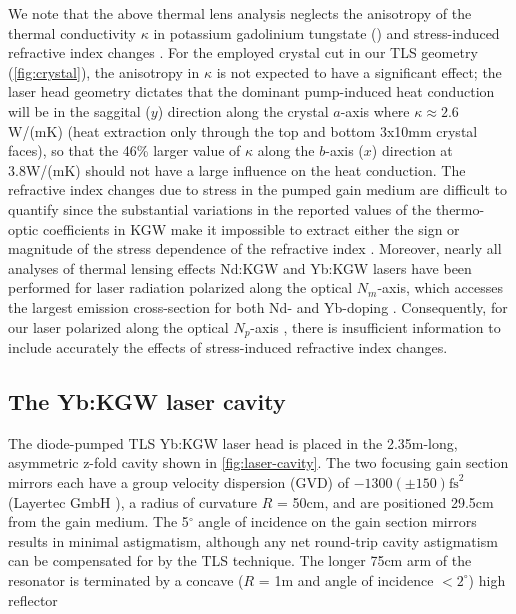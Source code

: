 We note that the above thermal lens analysis neglects the anisotropy of the thermal conductivity $\kappa$ in potassium gadolinium tungstate () \cite{Biswal_thermo_optical_05,mochalov_laser_1997} and stress-induced refractive index changes \cite{Yumashev_laser_2007}.
For the employed crystal cut in our TLS geometry (\ref{fig:crystal}), the anisotropy in $\kappa$ \cite{mochalov_laser_1997,website_EKSPLA} is not expected to have a significant effect; the laser head geometry dictates that the dominant pump-induced heat conduction will be in the saggital ($y$) direction along the crystal $a$-axis where $\kappa \approx 2.6$W/(mK) (heat extraction only through the top and bottom 3x10mm crystal faces), so that the 46\% larger value of $\kappa$ along the $b$-axis ($x$) direction at 3.8W/(mK) should not have a large influence on the heat conduction.
The refractive index
changes due to stress in the pumped gain medium are difficult to quantify since the substantial variations in the reported values of the thermo-optic coefficients in KGW make it impossible to extract either the sign or magnitude of the stress dependence of the refractive index \cite{website_time_bandwidth}.
Moreover, nearly all analyses of thermal lensing effects Nd:KGW and Yb:KGW lasers have been performed for laser radiation polarized along the optical $N_m$-axis, which accesses the largest emission cross-section for both Nd- and Yb-doping \cite{Yumashev_laser_2007,Hellstrom_efficient_2006}.
Consequently, for our laser polarized along the optical $N_p$-axis \cite{Holtom_mode_locked_2006}, there is insufficient information to include accurately the effects of stress-induced refractive index changes.

\subsection{The Yb:KGW laser cavity}

The diode-pumped TLS Yb:KGW laser head is placed in the 2.35m-long, asymmetric z-fold cavity shown in \ref{fig:laser-cavity}.
The two focusing gain section mirrors each have a group velocity dispersion (GVD) of $-1300 ( \pm 150 ) \text{fs}^2$ (Layertec GmbH \cite{website_layertec}), a radius of curvature $R$ = 50cm, and are positioned 29.5cm from the gain medium.
The 5$^\circ$ angle of incidence on the gain section mirrors results in minimal astigmatism, although any net round-trip cavity astigmatism can be compensated for by the TLS technique.
The longer 75cm arm of the resonator is terminated by a concave ($R$ = 1m and angle of incidence $< 2^\circ$) high reflector

